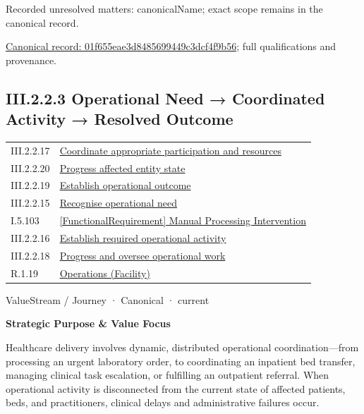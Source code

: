 {\small Recorded unresolved matters: canonicalName; exact scope remains in the canonical record.}\par
{\footnotesize \href{../../../../../../../continuum/strategy/value-stream/01f655eae3d8485699449c3dcf4f9b56.md}{Canonical record: 01f655eae3d8485699449c3dcf4f9b56}; full qualifications and provenance.}\par
\subsection*{III.2.2.3 Operational Need → Coordinated Activity → Resolved Outcome}
\label{navigation:III.2.2.3}

\begin{longtable}{p{.22\linewidth}p{.73\linewidth}}
III.2.2.17 & \hyperref[element:429446296e4b4a64a11b1b3d8385b12e]{Coordinate appropriate participation and resources} \\
III.2.2.20 & \hyperref[element:57880d06fd0b47d2a19d695afd7d48fc]{Progress affected entity state} \\
III.2.2.19 & \hyperref[element:79f756815e3645eb82a150870dc12502]{Establish operational outcome} \\
III.2.2.15 & \hyperref[element:843798840da0410499908004459d1fbd]{Recognise operational need} \\
I.5.103 & \hyperref[element:911511665a8a4135b7f2a37f5f79ad36]{[FunctionalRequirement] Manual Processing Intervention} \\
III.2.2.16 & \hyperref[element:a3d8f16b4c69430e9024f002bdfb6c86]{Establish required operational activity} \\
III.2.2.18 & \hyperref[element:b404dffef05e4f2bb9d414e4d1ed33af]{Progress and oversee operational work} \\
R.1.19 & \hyperref[element:df3a61b2745d45d69665cefe99db644e]{Operations (Facility)} \\
\end{longtable}
\label{element:beea615ca7b34bbcbd0ad3a2a6ab2cff}
{\small ValueStream / Journey · Canonical · current}\par

\par\medskip\textbf{Strategic Purpose \& Value Focus}\par


Healthcare delivery involves dynamic, distributed operational coordination—from processing an urgent laboratory order, to coordinating an inpatient bed transfer, managing clinical task escalation, or fulfilling an outpatient referral. When operational activity is disconnected from the current state of affected patients, beds, and practitioners, clinical delays and administrative failures occur.



